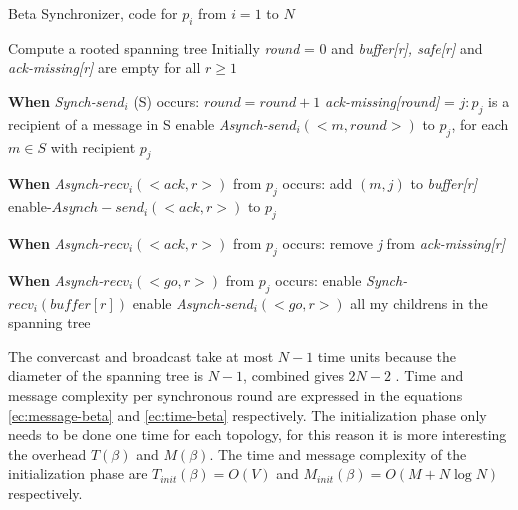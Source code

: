 \begin{algorithm}
 \caption{Beta Synchronizer, code for $p_i$ from $i = 1$ to $N$}
 \label{algorithm:beta} 

\SetAlgoNoLine

Compute a rooted spanning tree
Initially \textit{round} = 0 and \newline
\textit{buffer[r], safe[r]} and \textit{ack-missing[r]} are empty for all $r \geq 1$ \newline

\textbf{When} \textit{Synch-}$send_i$ (S) occurs:\newline
$round = round + 1$ \newline
\textit{ack-missing[round]} = {$j:p_j$ is a recipient of a message in S} \newline
enable \textit{Asynch-}$send_i(<m,round>)$  to $p_j$, for each $m \in S$ with recipient $p_j$ \newline

\textbf{When} \textit{Asynch-}$recv_i(<ack,r>)$ from $p_j$ occurs: \newline
add $(m,j)$ to \textit{buffer[r]} \newline
enable-$Asynch-send_i(<ack,r>)$ to $p_j$ \newline

\textbf{When} \textit{Asynch-}$recv_i(<ack,r>)$ from $p_j$ occurs: \newline
remove \textit{j} from \textit{ack-missing[r]} \newline
{}

\textbf{When} \textit{Asynch-}$recv_i(<go,r>)$ from $p_j$ occurs: \newline
  enable \textit{Synch-}$recv_i(buffer[r])$ \newline
  enable \textit{Asynch-}$send_i(<go,r>)$ all my childrens in the spanning tree \newline

\end{algorithm}

The convercast and broadcast take at most $N - 1$ time units because the diameter of the spanning tree is $N - 1$, combined gives $2N - 2$ . Time and message  complexity per synchronous round are expressed in the equations \ref{ec:message-beta} and \ref{ec:time-beta} respectively. The initialization phase only needs to be done one time for each topology, for this reason it is more interesting the overhead $T(\beta)$ and $M(\beta)$. The time and message complexity of the initialization phase are $T_{init}(\beta) = O(V)$ and $M_{init}(\beta) = O(M + N \log N)$  respectively.

